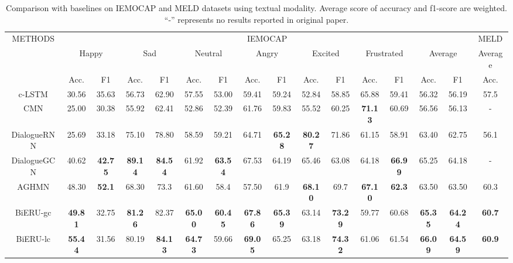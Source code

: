 \documentclass[journal]{IEEEtran}
\begin{document}
\linespread{1.25}
\begin{table*}[!ht]
    \centering
\begin{tabular}{|c||cc|cc|cc|cc|cc|cc|cc||c|}
    \hline
    \multirow{3}{*}{METHODS} & \multicolumn{14}{c||}{IEMOCAP} &
    \multicolumn{1}{c|}{MELD} \\
    \cline{2-16}
    & \multicolumn{2}{c|}{Happy} & \multicolumn{2}{c|}{Sad} & \multicolumn{2}{c|}{Neutral} & \multicolumn{2}{c|}{Angry} & \multicolumn{2}{c|}{Excited} & \multicolumn{2}{c|}{Frustrated} & \multicolumn{2}{c||}{Average} &
    \multicolumn{1}{c|}{Average} \\
    \cline{2-16}
	&	Acc. &	F1 &  Acc.	& F1 & Acc.	& F1 & Acc.	&	F1 &  Acc.	&	F1 & Acc.	&	F1 &  Acc.	&	F1  & Acc.	\\


\hline
c-LSTM & 30.56 & 35.63 & 56.73  & 62.90 & 57.55 & 53.00 & 59.41 & 59.24 & 52.84 & 58.85 & 65.88 & 59.41 & 56.32 & 56.19 & 57.5    \\
\hline
CMN & 25.00 & 30.38 & 55.92 & 62.41 & 52.86 & 52.39 & 61.76 & 59.83 & 55.52 & 60.25 & \textbf{71.13} & 60.69 & 56.56 & 56.13 & -    \\
\hline
DialogueRNN	&	25.69 & 33.18	&	75.10 & 78.80	&	58.59 & 59.21	&	64.71 & \textbf{65.28}	&	\textbf{80.27} & 71.86	&	61.15 & 58.91	&	63.40	&	62.75 &  56.1 \\
\hline
DialogueGCN	&	40.62  & \textbf{42.75}	&	\textbf{89.14} & \textbf{84.54}	&	61.92 & \textbf{63.54}	&	67.53 & 64.19	&	65.46 & 63.08	&	64.18 & \textbf{66.99}	&	65.25	&	64.18	& - \\
\hline
AGHMN	&	48.30 & \textbf{52.1}	&	68.30 & 73.3	&	61.60 & 58.4	&	57.50 & 61.9	&	\textbf{68.10} &  69.7	&	\textbf{67.10} & \textbf{62.3}	&	63.50	&	63.50  & 60.3 \\
\hline
BiERU-gc	&	\textbf{49.81} & 32.75	&	\textbf{81.26} & 82.37	&	\textbf{65.00} & \textbf{60.45}	&	\textbf{67.86} & \textbf{65.39}	&	63.14 & \textbf{73.29}	&	59.77 & 60.68	&	\textbf{65.35} & \textbf{64.24} & \textbf{60.7}    \\
\hline
BiERU-lc	& \textbf{55.44} & 31.56	&	80.19  & \textbf{84.13}	&	\textbf{64.73} & 59.66	&	\textbf{69.05} & 65.25	&	63.18 & \textbf{74.32}	&	61.06 & 61.54	&	\textbf{66.09}	&	\textbf{64.59}	& \textbf{60.9}\\
    \hline
    \end{tabular}
\linespread{1}
    \caption{Comparison with baselines on IEMOCAP and MELD datasets using textual modality. Average score of accuracy and f1-score are weighted. ``-'' represents no results reported in original paper.}
    \label{tab:results}
\end{table*}
\end{document}
